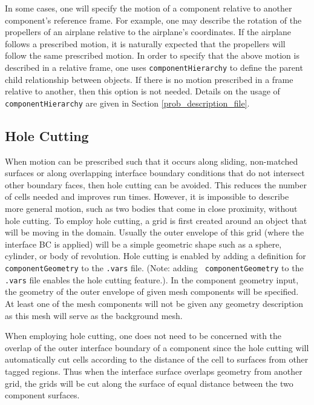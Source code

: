 \documentclass{article}
\begin{document}
In some cases, one will specify the motion of a component relative to
another component's reference frame.  For example, one may describe the
rotation of the propellers of an airplane relative to the airplane's
coordinates.  If the airplane follows a prescribed motion, it is
naturally expected that the propellers will follow the same prescribed
motion.  In order to specify that the above motion is described in a
relative frame, one uses {\tt componentHierarchy} to define the
parent child relationship between objects.  If there is no motion
prescribed in a frame relative to another, then this option is not
needed.  Details on the usage of {\tt componentHierarchy} are given in
Section \ref{prob_description_file}.

\subsection{Hole Cutting}

When motion can be prescribed such that it occurs along sliding,
non-matched surfaces or along overlapping interface boundary
conditions that do not intersect other boundary faces, then hole
cutting can be avoided.  This reduces the number of cells needed and
improves run times.  However, it is impossible to describe more
general motion, such as two bodies that come in close proximity,
without hole cutting.  To employ hole cutting, a grid is first created
around an object that will be moving in the domain.  Usually the outer
envelope of this grid (where the interface BC is applied) will be a
simple geometric shape such as a sphere, cylinder, or body of
revolution.  Hole cutting is enabled by adding a definition for {\tt
  componentGeometry} to the {\tt .vars} file. (Note: adding {\tt
  componentGeometry} to the {\tt .vars} file enables the hole cutting
feature.).  In the component geometry input, the geometry of the outer
envelope of given mesh components will be specified.  At least one of
the mesh components will not be given any geometry description as this
mesh will serve as the background mesh.

When employing hole cutting, one does not need to be concerned
with the overlap of the outer interface boundary of a component since
the hole cutting will automatically cut cells according to the
distance of the cell to surfaces from other tagged regions.  Thus
when the interface surface overlaps geometry from another grid, the
grids will be cut along the surface of equal distance between the two
component surfaces.
\end{document}
